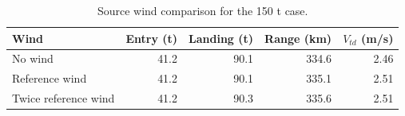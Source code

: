 \begin{table}[htbp]
\caption{Source wind comparison for the 150 t case.}
\label{tab:src9}
\small
\setlength{\tabcolsep}{3.5pt}
\begin{tabularx}{\linewidth}{@{}Xrrrr@{}}
\toprule
Wind & Entry (t) & Landing (t) & Range (km) & $V_{td}$ (m/s) \\
\midrule
No wind & 41.2 & 90.1 & 334.6 & 2.46 \\
Reference wind & 41.2 & 90.1 & 335.1 & 2.51 \\
Twice reference wind & 41.2 & 90.3 & 335.6 & 2.51 \\
\bottomrule
\end{tabularx}
\end{table}
